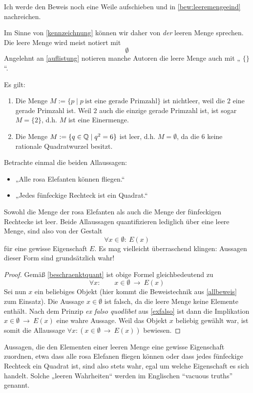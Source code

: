 \noindent Ich werde den Beweis noch eine Weile aufschieben und in \cref{bew:leeremengeeind} nachreichen.


\begin{nota}
    Im Sinne von \cref{kennzeichnung} können wir daher von \emph{der} leeren Menge sprechen. Die leere Menge wird meist notiert mit
        \[ \emptyset \]
    Angelehnt an \cref{auflistung} notieren manche Autoren die leere Menge auch mit „ $\{\}$ “.
\end{nota}


\begin{bsp}
    Es gilt:
    \begin{enumerate}
        \item Die Menge $M:=\{p\mid p\ \text{ist eine gerade Primzahl}\}$ ist nichtleer, weil die $2$ eine gerade Primzahl ist. Weil $2$ auch die einzige gerade Primzahl ist, ist sogar $M=\{2\}$, d.h. $M$ ist eine Einermenge.
        \item Die Menge $M:= \{ q\in \mathbb Q\mid q^2=6\}$ ist leer, d.h. $M=\emptyset$, da die $6$ keine rationale Quadratwurzel besitzt.
    \end{enumerate}
\end{bsp}


\begin{bem} \label{vacuoustruth} 
    Betrachte einmal die beiden Allaussagen:
    \begin{itemize}
        \item „Alle rosa Elefanten können fliegen.“
        \item „Jedes fünfeckige Rechteck ist ein Quadrat.“
    \end{itemize}	
    Sowohl die Menge der rosa Elefanten als auch die Menge der fünfeckigen Rechtecke ist leer. Beide Allaussagen quantifizieren lediglich über eine leere Menge, sind also von der Gestalt
        \[ \forall x\in \emptyset:\ E(x) \]
    für eine gewisse Eigenschaft $E$. Es mag vielleicht überraschend klingen: Aussagen dieser Form sind grundsätzlich wahr!
    \begin{proof}
        Gemäß \cref{beschraenktquant} ist obige Formel gleichbedeutend zu
            \[ \forall x:\qquad x\in \emptyset\ \to\ E(x) \]
        Sei nun $x$ ein beliebiges Objekt (hier kommt die Beweistechnik aus \cref{allbeweis} zum Einsatz). Die Aussage $x\in\emptyset$ ist falsch, da die leere Menge keine Elemente enthält. Nach dem Prinzip \emph{ex falso quodlibet} aus \cref{exfalso} ist dann die Implikation $x\in \emptyset\ \to\ E(x)$ eine wahre Aussage. Weil das Objekt $x$ beliebig gewählt war, ist somit die Allaussage $\forall x: \left(x\in \emptyset\ \to\ E(x)\right)$ bewiesen.
	\end{proof}
    \noindent Aussagen, die den Elementen einer leeren Menge eine gewisse Eigenschaft zuordnen, etwa dass alle rosa Elefanen fliegen können oder dass jedes fünfeckige Rechteck ein Quadrat ist, sind also stets wahr, egal um welche Eigenschaft es sich handelt. Solche „leeren Wahrheiten“ werden im Englischen ``vacuous truths'' genannt.
\end{bem}


